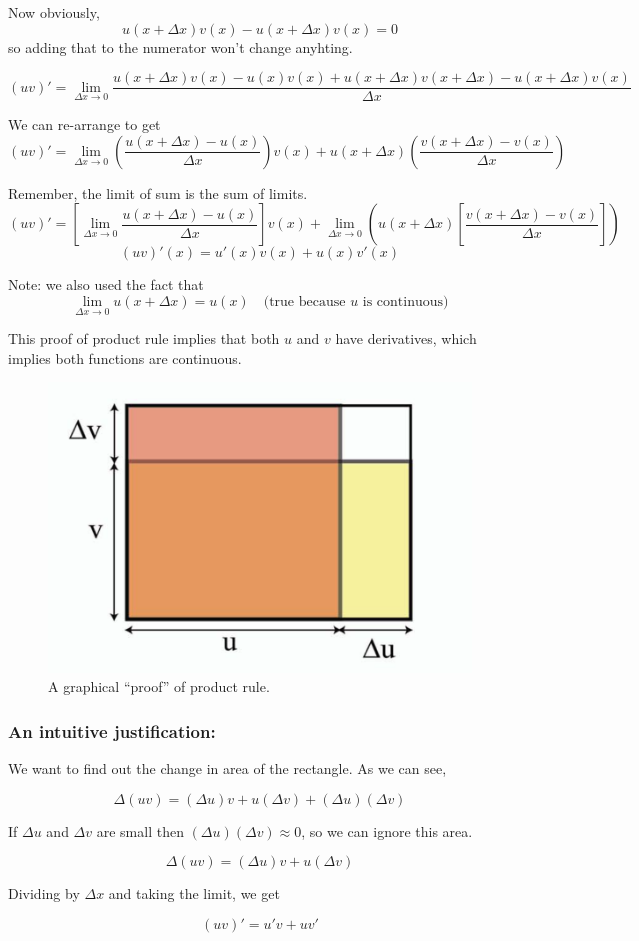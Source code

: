 Now obviously, $$u(x+\Delta x)v(x) - u(x+\Delta x)v(x) = 0$$
so adding that to the numerator won't change anyhting.

$$
(uv)' = \lim_{\Delta x \to 0} 
	\frac{
		u(x+\Delta x)v(x)
		- u(x)v(x)
		+ u(x+\Delta x)v(x+\Delta x)
		- u(x+\Delta x)v(x)
	}{\Delta x}
$$

We can re-arrange to get
$$
(uv)' = \lim_{\Delta x \to 0} 
	\left( \frac{u(x+\Delta x) - u(x)}{\Delta x} \right) v(x) +
	u(x+\Delta x) \left( \frac{v(x+\Delta x) - v(x)}{\Delta x} \right) 
$$

Remember, the limit of sum is the sum of limits.
$$
(uv)' = \left[ \lim_{\Delta x \to 0} \frac{u(x+\Delta x) - u(x)}{\Delta x} \right] v(x) +
	\lim_{\Delta x \to 0} \left( u(x+\Delta x) \left[ \frac{v(x+\Delta x) - v(x)}{\Delta x} \right] \right)
$$
$$(uv)'(x) = u'(x)v(x) + u(x)v'(x)$$

Note: we also used the fact that $$ \lim_{\Delta x \to 0} u(x+\Delta x) = u(x) \quad \text{(true because $u$ is continuous)}$$

This proof of product rule implies that both $u$ and $v$ have derivatives, which implies both functions are continuous.

\pagebreak

\begin{figure}[h]
	\centering
	\includegraphics[scale=0.7]{./images/lecture_3_figure_1.png}
	\caption{A graphical ``proof'' of product rule.}    
\end{figure}

\subsubsection*{An intuitive justification:}

We want to find out the change in area of the rectangle. As we can see, 

$$\Delta(uv) = (\Delta u)v + u(\Delta v) + (\Delta u)(\Delta v)$$

If $\Delta u$ and $\Delta v$ are small then $(\Delta u)(\Delta v) \approx 0$, so we can ignore this area.

$$\Delta(uv) = (\Delta u)v + u(\Delta v)$$

Dividing by $\Delta x$ and taking the limit, we get

$$(uv)' = u'v + uv'$$

